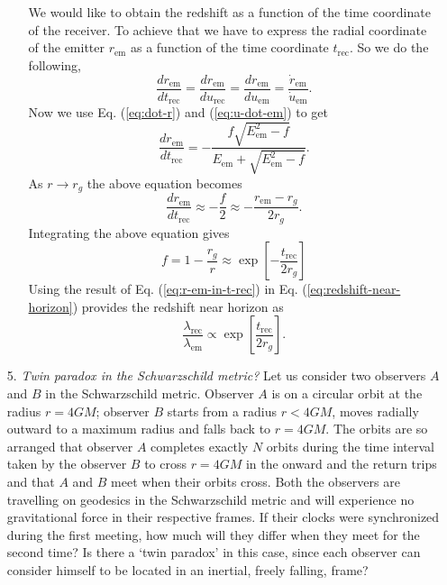 \documentclass{article}
\begin{document}
\begin{enumerate}
\begin{enumerate}
We would like to obtain the redshift as a function of the time coordinate of the receiver. To achieve that we have to express the radial coordinate of the emitter $r_\textrm{em}$ as a function of the time coordinate $t_\textrm{rec}$. So we do the following,
\begin{equation}
  \label{eq:r-em-t-rec}
  \frac{dr_\textrm{em}}{dt_\textrm{rec}} = \frac{dr_\textrm{em}}{du_\textrm{rec}} = \frac{dr_\textrm{em}}{du_\textrm{em}} = \frac{\dot{r}_\textrm{em}}{\dot{u}_\textrm{em}}.
\end{equation}
Now we use Eq. (\ref{eq:dot-r}) and (\ref{eq:u-dot-em}) to get
\begin{equation}
  \label{eq:dr-dt-em}
  \frac{dr_\textrm{em}}{dt_\textrm{rec}} = -\frac{f\sqrt{E^2_{\text{em}}-f}}{E_{\text{em}} + \sqrt{E^2_{\text{em}}-f}}.
\end{equation}
As $r\to r_g$ the above equation becomes
\begin{equation}
  \label{eq:dr-dt-em-r_g}
  \frac{dr_\textrm{em}}{dt_\textrm{rec}} \approx -\frac{f}{2} \approx -\frac{r_\textrm{em}-r_g}{2r_g}.
\end{equation}
Integrating the above equation gives
\begin{equation}
  \label{eq:r-em-in-t-rec}
  f = 1-\frac{r_g}{r} \approx \exp\left[{-\frac{t_\textrm{rec}}{2r_g}}\right]
\end{equation}
Using the result of Eq. (\ref{eq:r-em-in-t-rec}) in Eq. (\ref{eq:redshift-near-horizon}) provides the redshift near horizon as
\begin{equation}
  \label{eq:redshift-in-t-rec}
    \boxed{\frac{\lambda_{\text{rec}}}{\lambda_{\text{em}}} \propto \exp\left[{\frac{t_\textrm{rec}}{2r_g}}\right]}.
\end{equation}
\end{enumerate}

\item[5.]
  {\itshape Twin paradox in the Schwarzschild metric?} Let us consider two observers $A$ and $B$ in the Schwarzschild metric. Observer $A$ is on a circular orbit at the radius $r = 4GM$; observer $B$ starts from a radius $r < 4GM$, moves radially outward to a maximum radius and falls back to $r = 4GM.$ The orbits are so arranged that observer $A$ completes exactly $N$ orbits during the time interval taken by the observer $B$ to cross $r = 4GM$ in the onward and the return trips and that $A$ and $B$ meet when their orbits cross. Both the observers are travelling on geodesics in the Schwarzschild metric and will experience no gravitational force in their respective frames. If their clocks were synchronized during the first meeting, how much will they differ when they meet for the second time? Is there a ‘twin paradox’ in this case, since each observer can consider himself to be located in an inertial, freely falling, frame?


\end{enumerate}
\end{document}
